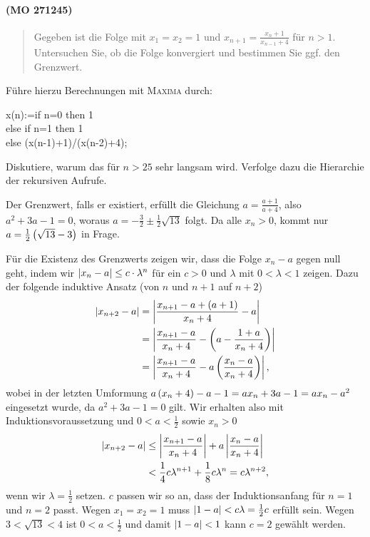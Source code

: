 \documentclass[11pt,a4paper]{article}
\newcommand{\cas}[1]{\textsc{#1}}
\begin{document}
\paragraph{(MO 271245)}
\begin{quote}
  Gegeben ist die Folge mit $x_1=x_2=1$ und $x_{n+1}=\frac{x_n+1}{x_{n-1}+4}$
  für $n>1$.  Untersuchen Sie, ob die Folge konvergiert und bestimmen Sie ggf.
  den Grenzwert.
\end{quote}
Führe hierzu Berechnungen mit \cas{Maxima} durch:
\begin{code}
  x(n):=if n=0 then 1\\
else if n=1 then 1\\
else (x(n-1)+1)/(x(n-2)+4);
\end{code}
Diskutiere, warum das für $n>25$ sehr langsam wird.  Verfolge dazu die
Hierarchie der rekursiven Aufrufe. 

\begin{loesung}
Der Grenzwert, falls er existiert, erfüllt die Gleichung $a=\frac{a+1}{a+4}$,
also $a^2+3a-1=0$, woraus $a=-\frac32\pm\frac12\sqrt{13}$ folgt.  Da alle
$x_n>0$, kommt nur $a=\frac12\left(\sqrt{13}-3\right)$ in Frage.

Für die Existenz des Grenzwerts zeigen wir, dass die Folge $x_n-a$ gegen null
geht, indem wir $\left\vert x_n-a\right\vert\le c\cdot \lambda^n$ für ein $c>0$ und $\lambda$ mit
$0<\lambda<1$ zeigen. Dazu der folgende induktive Ansatz (von $n$ und $n+1$
auf $n+2$)
\begin{align*}
  \left\vert x_{n+2}-a\right\vert&=\left\vert \frac{x_{n+1}-a+(a+1)}{x_n+4}-a\right\vert\\
  &=\left\vert \frac{x_{n+1}-a}{x_n+4}-\left(a-\frac{1+a}{x_n+4}\right)\right\vert\\
  &=\left\vert \frac{x_{n+1}-a}{x_n+4}-a\left(\frac{x_n-a}{x_n+4}\right)\right\vert,
\end{align*}
wobei in der letzten Umformung $a\left(x_n+4\right)-a-1=ax_n+3a-1=ax_n-a^2$ eingesetzt
wurde, da $a^2+3a-1=0$ gilt.  Wir erhalten also mit Induktionsvoraussetzung
und $0<a<\frac12$ sowie $x_n>0$
\begin{align*}
  \left\vert x_{n+2}-a\right\vert&\le
  \left\vert \frac{x_{n+1}-a}{x_n+4}\right\vert+a\left\vert \frac{x_n-a}{x_n+4}\right\vert\\
  &<\frac14 c \lambda^{n+1} + \frac18 c \lambda^n = c \lambda^{n+2},
\end{align*}
wenn wir $\lambda=\frac12$ setzen. $c$ passen wir so an, dass der
Induktionsanfang für $n=1$ und $n=2$ passt.  Wegen $x_1=x_2=1$ muss
$\left\vert 1-a\right\vert<c \lambda=\frac12 c$ erfüllt sein. Wegen $3<\sqrt{13}<4$ ist
$0<a<\frac12$ und damit $\left\vert 1-a\right\vert<1$ kann $c=2$ gewählt werden.   
\end{loesung}
\end{document}
